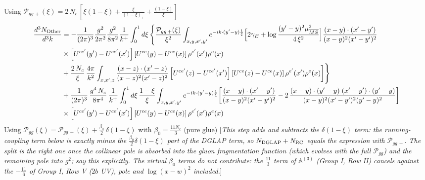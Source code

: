 \documentclass[9pt]{article}
\def\mf#1{\mathbb{#1}}
\newcommand{\chg}[1]{{\color{red}#1}}
\newcommand{\rnote}[1]{{\color{teal}[\textit{#1}]}}
\numberwithin{equation}{section}
\begin{document}
Using $\mathcal P_{gg\,+}(\xi) =  2\,N_{c}\,\left[\xi(1-\xi) + \frac{\xi}{(1-\xi)_{+}} + \frac{(1-\xi)}{\xi}\right]$
\begin{align}
\frac{d^{3}N_{\rm Other}}{d^{3}k} & = -\frac{1}{(2\pi)^{3}}\frac{g^{2}}{2\pi^{2}}\frac{g^{2}}{8\pi^{2}}\frac{1}{k^{+}}\int_{0}^{1}d\xi\,\Bigg\{\frac{\mathcal P_{gg\,+}(\xi)}{\xi^{2}}\int_{x,y,x',y'}e^{-ik\cdot(y'-y)\frac{1}{\xi}}\Big[2\gamma_{E}+\log\frac{(y'-y)^{2}\mu^{2}_{\overline{MS}}}{4\,\xi^{2}}\Big]\frac{(x-y)\cdot(x'-y')}{(x-y)^{2}(x'-y')^{2}}\notag\\
&\times\left[U^{ce'}(y') - U^{ce'}(x')\right]\left[U^{ce}(y) - U^{ce}(x)\right]\rho^{e'}(x')\rho^{e}(x) \notag\\
&+\frac{2\,N_{c}}{\xi}\,\frac{4\pi}{k^{2}}\int_{x,x',z}\frac{(x-z)\cdot(x'-z)}{(x-z)^{2}(x'-z)^{2}}\left[U^{ce'}(z) - U^{ce'}(x')\right]\left[U^{ce}(z) - U^{ce}(x)\right]\rho^{e'}(x')\rho^{e}(x)\bigg]\Bigg\}\notag\\
&+\frac{1}{(2\pi)^{3}}\,\frac{g^{4}\,N_{c}}{8\pi^{4}}\,\frac{1}{k^{+}}\int_{0}^{1}d\xi\,\frac{1-\xi}{\xi}\int_{x,y,x',y'}e^{-ik\cdot(y'-y)\frac{1}{\xi}}\bigg[\frac{(x-y)\cdot(x'-y')}{(x-y)^{2}(x'-y')^{2}}-2\,\frac{(x-y)\cdot(y'-y)\;(x'-y')\cdot(y'-y)}{(x-y)^{2}(x'-y')^{2}(y'-y)^{2}}\bigg]\notag\\
&\times\left[U^{ce'}(y') - U^{ce'}(x')\right]\left[U^{ce}(y) - U^{ce}(x)\right]\rho^{e'}(x')\rho^{e}(x)
\end{align}
Using $\mathcal{P}_{gg}(\xi) = \mathcal{P}_{gg\,+}(\xi) +\frac{\beta_{0}}{2}\,\delta(1-\xi)$ \chg{with $\beta_{0}=\frac{11N_{c}}{3}$ (pure glue)}
\rnote{This step adds and subtracts the $\delta(1-\xi)$ term: the running-coupling term below is exactly minus the $\frac{\beta_{0}}{2}\delta(1-\xi)$ part of the DGLAP term, so $N_{\rm DGLAP}+N_{\rm RC}$ equals the expression with $\mathcal{P}_{gg\,+}$. The split is the right one once the collinear pole is absorbed into the gluon fragmentation function (which evolves with the full $\mathcal{P}_{gg}$) and the remaining pole into $g^{2}$; say this explicitly. The virtual $\beta_{0}$ terms do not contribute: the $\frac{11}{3}$ term of $\mf{A}^{(3)}$ (Group I, Row II) cancels against the $-\frac{11}{6}$ of Group I, Row V ($2b$ UV), pole and $\log(x-w)^{2}$ included.}
\end{document}
